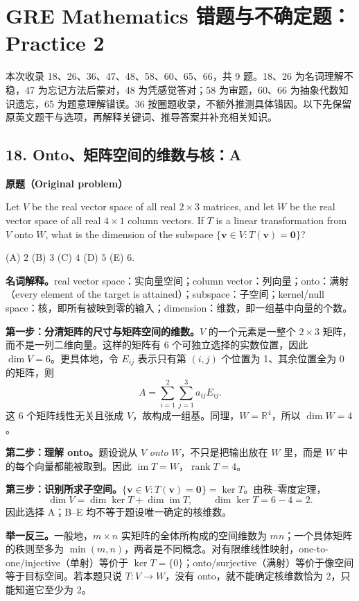 \documentclass[11pt,a4paper,fontset=fandol]{ctexart}
\begin{document}
\section{GRE Mathematics 错题与不确定题：Practice 2}
本次收录 18、26、36、47、48、58、60、65、66，共 9 题。18、26 为名词理解不稳，47 为忘记方法后蒙对，48 为凭感觉答对；58 为审题，60、66 为抽象代数知识遗忘，65 为题意理解错误。36 按圈题收录，不额外推测具体错因。以下先保留原英文题干与选项，再解释关键词、推导答案并补充相关知识。

\subsection{18. Onto、矩阵空间的维数与核：A}
\label{p2:q18}
\textbf{原题（Original problem）}

Let $V$ be the real vector space of all real $2\times3$ matrices, and let $W$ be the real vector space of all real $4\times1$ column vectors. If $T$ is a linear transformation from $V$ onto $W$, what is the dimension of the subspace $\{\mathbf v\in V:T(\mathbf v)=\mathbf0\}$?

(A) $2$ \quad (B) $3$ \quad (C) $4$ \quad (D) $5$ \quad (E) $6$.

\textbf{名词解释。}real vector space：实向量空间；column vector：列向量；onto：满射（every element of the target is attained）；subspace：子空间；kernel/null space：核，即所有被映到零的输入；dimension：维数，即一组基中向量的个数。

\textbf{第一步：分清矩阵的尺寸与矩阵空间的维数。}$V$ 的一个元素是一整个 $2\times3$ 矩阵，而不是一列二维向量。这样的矩阵有 6 个可独立选择的实数位置，因此 $\dim V=6$。更具体地，令 $E_{ij}$ 表示只有第 $(i,j)$ 个位置为 1、其余位置全为 0 的矩阵，则
\[
A=\sum_{i=1}^{2}\sum_{j=1}^{3}a_{ij}E_{ij}.
\]
这 6 个矩阵线性无关且张成 $V$，故构成一组基。同理，$W=\mathbb R^4$，所以 $\dim W=4$。

\textbf{第二步：理解 onto。}题设说从 $V$ \emph{onto} $W$，不只是把输出放在 $W$ 里，而是 $W$ 中的每个向量都能被取到。因此 $\operatorname{im}T=W$，$\operatorname{rank}T=4$。

\textbf{第三步：识别所求子空间。}$\{\mathbf v\in V:T(\mathbf v)=\mathbf0\}=\ker T$。由秩--零度定理，
\begin{equation}
\dim V=\dim\ker T+\dim\operatorname{im}T,
\qquad \dim\ker T=6-4=\boxed{2}.
\label{p2:rank-nullity}
\end{equation}
因此选择 A；B--E 均不等于题设唯一确定的核维数。

\textbf{举一反三。}一般地，$m\times n$ 实矩阵的全体所构成的空间维数为 $mn$；一个具体矩阵的秩则至多为 $\min(m,n)$，两者是不同概念。对有限维线性映射，one-to-one/injective（单射）等价于 $\ker T=\{0\}$；onto/surjective（满射）等价于像空间等于目标空间。若本题只说 $T:V\to W$，没有 onto，就不能确定核维数恰为 2，只能知道它至少为 2。
\end{document}
